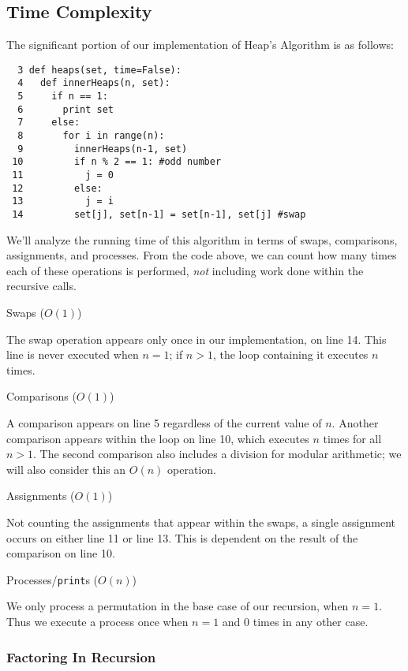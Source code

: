 \documentclass[10pt, oneside]{article}   	%
\begin{document}
\subsection{Time Complexity}

The significant portion of our implementation of Heap's Algorithm is as follows:
\begin{verbatim}
  3 def heaps(set, time=False):
  4   def innerHeaps(n, set):
  5     if n == 1:
  6       print set
  7     else:
  8       for i in range(n):
  9         innerHeaps(n-1, set)
 10         if n % 2 == 1: #odd number
 11           j = 0
 12         else:
 13           j = i
 14         set[j], set[n-1] = set[n-1], set[j] #swap
\end{verbatim}

We'll analyze the running time of this algorithm in terms of swaps, comparisons, assignments, and processes. From the code above, we can count how many times each of these operations is performed, \emph{not} including work done within the recursive calls.
\begin{description}
\item Swaps ($O(1)$)

	The swap operation appears only once in our implementation, on line 14. This line is never executed when $n=1$; if $n > 1$, the loop containing it executes $n$ times.

\item Comparisons ($O(1)$)

	A comparison appears on line 5 regardless of the current value of $n$. Another comparison appears within the loop on line 10, which executes $n$ times for all $n > 1$. The second comparison also includes a division for modular arithmetic; we will also consider this an $O(n)$ operation.

\item Assignments ($O(1)$)

	Not counting the assignments that appear within the swaps, a single assignment occurs on either line 11 or line 13. This is dependent on the result of the comparison on line 10.

\item Processes/\texttt{print}s ($O(n)$)

	We only process a permutation in the base case of our recursion, when $n = 1$. Thus we execute a process once when $n = 1$ and 0 times in any other case.
\end{description}

\subsubsection{Factoring In Recursion}
\end{document}
